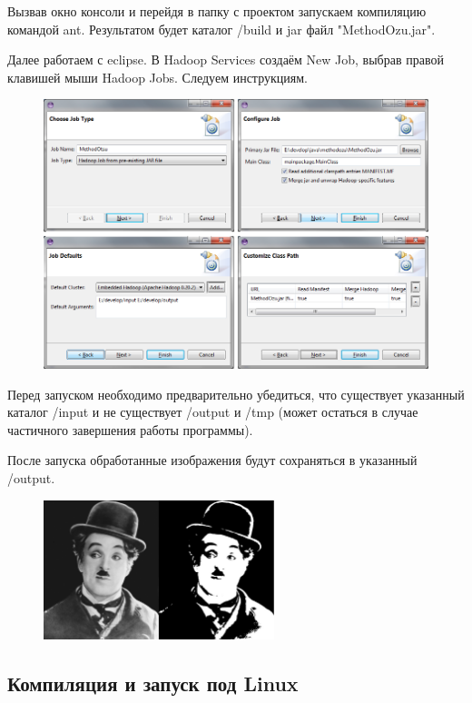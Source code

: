 \documentclass[12pt,a4paper]{extarticle} %
\begin{document}
\clearpage\newpage
    Вызвав окно консоли и перейдя в папку с проектом запускаем компиляцию командой ant. Результатом будет каталог /build и jar файл "MethodOzu.jar".

    Далее работаем с eclipse. В Hadoop Services создаём New Job, выбрав правой клавишей мыши Hadoop Jobs. Следуем инструкциям. 
\begin{figure}[h]
    \centering
    \includegraphics[width=\textwidth]{images/eclipse-create-job.png}
\end{figure}

    Перед запуском необходимо предварительно убедиться, что существует указанный каталог /input и не существует /output и /tmp (может остаться в случае частичного завершения работы программы).

    После запуска обработанные изображения будут сохраняться в указанный /output.
\begin{figure}[h]
    \centering
    \includegraphics[width=0.6\textwidth]{images/charlie.png}
\end{figure}

\clearpage\newpage
\subsection{Компиляция и запуск под Linux}
\end{document}

